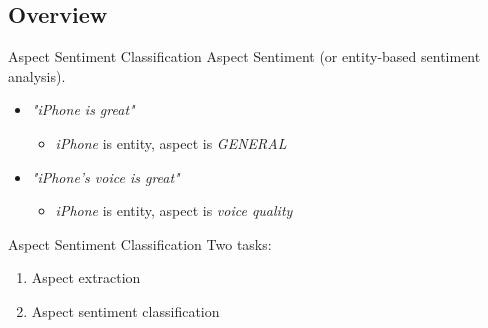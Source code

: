 \documentclass[xcolor=table]{beamer}
\begin{document}
\subsection{Overview}
\begin{frame}{Aspect Sentiment Classification}
    Aspect Sentiment (or entity-based sentiment analysis).
    
    \begin{example}
    \begin{itemize}
        \item \textit{"iPhone is great"}
        \begin{itemize}
            \item \textit{iPhone} is entity, aspect is \textit{GENERAL}
        \end{itemize}
        
        \item \textit{"iPhone's voice is great"}
        \begin{itemize}
            \item \textit{iPhone} is entity, aspect is \textit{voice quality}
        \end{itemize}
    \end{itemize}
    \end{example}
\end{frame}

\begin{frame}{Aspect Sentiment Classification}
    Two tasks:
    \begin{enumerate}
        \item Aspect extraction
        \item Aspect sentiment classification
    \end{enumerate}
\end{frame}
\end{document}
